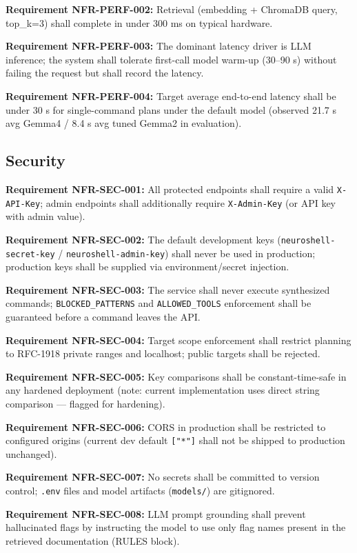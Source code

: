 \documentclass[10pt,journal,onecolumn]{IEEEtran}
\newcommand{\reqid}[1]{\textbf{#1}}
\begin{document}
\reqid{Requirement NFR-PERF-002:} Retrieval (embedding + ChromaDB query, top\_k=3) shall complete in under 300 ms on typical hardware.

\reqid{Requirement NFR-PERF-003:} The dominant latency driver is LLM inference; the system shall tolerate first-call model warm-up (30--90 s) without failing the request but shall record the latency.

\reqid{Requirement NFR-PERF-004:} Target average end-to-end latency shall be under 30 s for single-command plans under the default model (observed 21.7 s avg Gemma4 / 8.4 s avg tuned Gemma2 in evaluation).

\subsection{Security}

\reqid{Requirement NFR-SEC-001:} All protected endpoints shall require a valid \texttt{X-API-Key}; admin endpoints shall additionally require \texttt{X-Admin-Key} (or API key with admin value).

\reqid{Requirement NFR-SEC-002:} The default development keys (\texttt{neuroshell-secret-key} / \texttt{neuroshell-admin-key}) shall never be used in production; production keys shall be supplied via environment/secret injection.

\reqid{Requirement NFR-SEC-003:} The service shall never execute synthesized commands; \texttt{BLOCKED\_PATTERNS} and \texttt{ALLOWED\_TOOLS} enforcement shall be guaranteed before a command leaves the API.

\reqid{Requirement NFR-SEC-004:} Target scope enforcement shall restrict planning to RFC-1918 private ranges and localhost; public targets shall be rejected.

\reqid{Requirement NFR-SEC-005:} Key comparisons shall be constant-time-safe in any hardened deployment (note: current implementation uses direct string comparison --- flagged for hardening).

\reqid{Requirement NFR-SEC-006:} CORS in production shall be restricted to configured origins (current dev default \texttt{["*"]} shall not be shipped to production unchanged).

\reqid{Requirement NFR-SEC-007:} No secrets shall be committed to version control; \texttt{.env} files and model artifacts (\texttt{models/}) are gitignored.

\reqid{Requirement NFR-SEC-008:} LLM prompt grounding shall prevent hallucinated flags by instructing the model to use only flag names present in the retrieved documentation (RULES block).
\end{document}
